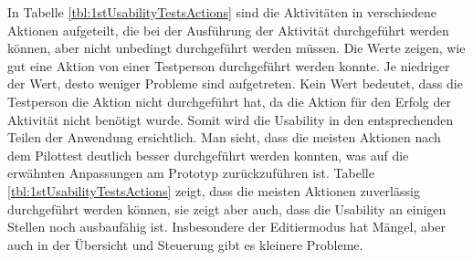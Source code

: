 In Tabelle \ref{tbl:1stUsabilityTestsActions} sind die Aktivitäten in verschiedene Aktionen aufgeteilt, die bei der Ausführung der Aktivität durchgeführt werden können, aber nicht unbedingt durchgeführt werden müssen. Die Werte zeigen, wie gut eine Aktion von einer Testperson durchgeführt werden konnte. Je niedriger der Wert, desto weniger Probleme sind aufgetreten. Kein Wert bedeutet, dass die Testperson die Aktion nicht durchgeführt hat, da die Aktion für den Erfolg der Aktivität nicht benötigt wurde. Somit wird die Usability in den entsprechenden Teilen der Anwendung ersichtlich. Man sieht, dass die meisten Aktionen nach dem Pilottest deutlich besser durchgeführt werden konnten, was auf die erwähnten Anpassungen am Prototyp zurückzuführen ist. Tabelle \ref{tbl:1stUsabilityTestsActions} zeigt, dass die meisten Aktionen zuverlässig durchgeführt werden können, sie zeigt aber auch, dass die Usability an einigen Stellen noch ausbaufähig ist. Insbesondere der Editiermodus hat Mängel, aber auch in der Übersicht und Steuerung gibt es kleinere Probleme.


